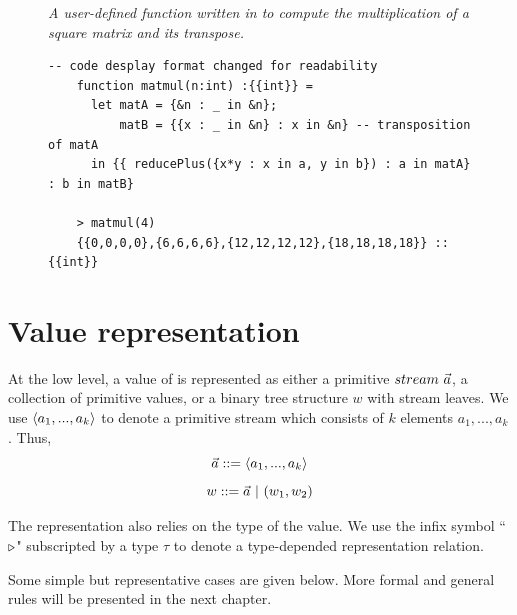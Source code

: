 \begin{figure}[H]\large
	\begin{example}\emph{A user-defined function  written in \mysnesl to compute the multiplication of a square matrix and its transpose.}
	\end{example}
	\begin{lstlisting}[style = nesl-style]
	-- code desplay format changed for readability
	function matmul(n:int) :{{int}} = 
  	  let matA = {&n : _ in &n};
	      matB = {{x : _ in &n} : x in &n} -- transposition of matA
	  in {{ reducePlus({x*y : x in a, y in b}) : a in matA} : b in matB}
	
	> matmul(4)
	{{0,0,0,0},{6,6,6,6},{12,12,12,12},{18,18,18,18}} :: {{int}}
	\end{lstlisting}
\end{figure}


\section{Value representation} \label{sec:valrep}
At the low level, a value of \mysnesl is represented as either a primitive $stream \ \vec a$, a collection of primitive values,
or a binary tree structure $w$ with stream leaves.
We use $\<a_1,...,a_k\'>$ to denote a primitive stream which consists of $k$ elements $a_1,...,a_k$. Thus,
$$ \a ::= \<a_1,...,a_k\'>$$
$$ w ::= \a \ | \ (w_1,w_2) $$


The representation also relies on the type of the value. 
We use the infix symbol ``$ \triangleright$" subscripted by a type $\tau$ to denote a type-depended representation relation.

Some simple but representative cases are given below. 
More formal and general rules will be presented in the next chapter.


